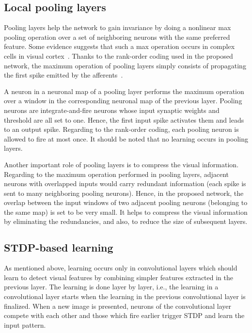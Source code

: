 \documentclass[preprint,5p,12pt,twocolumn]{article}
\begin{document}
\subsection*{Local pooling layers}
Pooling layers help the network to gain invariance by doing a nonlinear max pooling operation over a set of neighboring neurons with the same preferred feature. Some evidence suggests that such a max operation occurs in complex cells in visual cortex~\cite{Serre2007.PAMI}. Thanks to the rank-order coding used in the proposed network, the maximum operation of pooling layers simply consists of propagating the first spike emitted by the afferents~\cite{rousselet2003taking}.

A neuron in a neuronal map of a pooling layer performs the maximum operation over a window in the corresponding neuronal map of the previous layer. Pooling neurons are integrate-and-fire neurons whose input synaptic weights and threshold are all set to one. Hence, the first input spike activates them and leads to an output spike. Regarding to the rank-order coding, each pooling neuron is allowed to fire at most once. It should be noted that no learning occurs in pooling layers.

Another important role of pooling layers is to compress the visual information. Regarding to the maximum operation performed in pooling layers, adjacent neurons with overlapped inputs would carry redundant information (each spike is sent to many neighboring pooling neurons).  Hence, in the proposed network, the overlap between the input windows of two adjacent pooling neurons (belonging to the same map) is set to be very small. It helps to compress the visual information by eliminating the redundancies, and also, to reduce the size of subsequent layers.


\subsection*{STDP-based learning}
As mentioned above, learning occurs only in convolutional layers which should learn to detect visual features by combining simpler features extracted in the previous layer. The learning is done layer by layer, i.e., the learning in a convolutional layer starts when the learning in the previous convolutional layer is finalized. When a new image is presented, neurons of the convolutional layer compete with each other and those which fire earlier trigger STDP and learn the input pattern.
\end{document}
